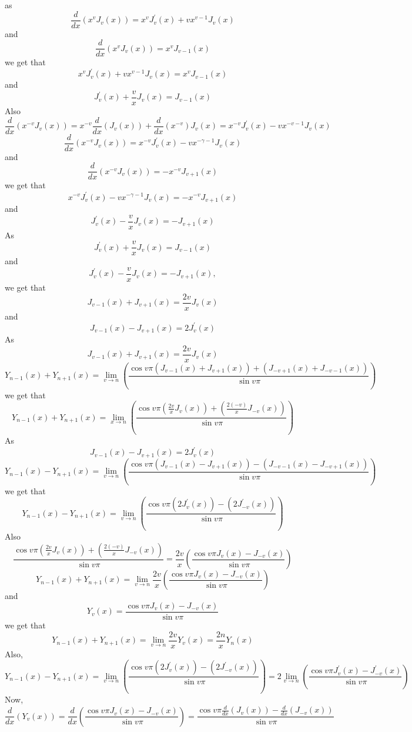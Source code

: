 \documentclass{article}
\begin{document}
\begin{flushleft}
$$$$
as
$$
\frac{d}{d x}\left(x^{v} J_{v}(x)\right)=x^{v} J_{v}^{\prime}(x)+v x^{v-1} J_{v}(x)
$$
and
$$
\frac{d}{d x}\left(x^{v} J_{v}(x)\right)=x^{v} J_{v-1}(x)
$$
we get that
$$
x^{v} J_{v}^{\prime}(x)+v x^{v-1} J_{v}(x)=x^{v} J_{v-1}(x)
$$
and
$$
J_{v}^{\prime}(x)+\frac{v}{x} J_{v}(x)=J_{v-1}(x)
$$
Also
$$
\frac{d}{d x}\left(x^{-v} J_{v}(x)\right)=x^{-v} \frac{d}{d x}\left(J_{v}(x)\right)+\frac{d}{d x}\left(x^{-v}\right) J_{v}(x)=x^{-v} J_{v}^{\prime}(x)-v x^{-v-1} J_{v}(x)
$$
$$
\frac{d}{d x}\left(x^{-v} J_{v}(x)\right)=x^{-v} J_{v}^{\prime}(x)-v x^{-\gamma-1} J_{v}(x)
$$
and
$$
\frac{d}{d x}\left(x^{-v} J_{v}(x)\right)=-x^{-v} J_{v+1}(x)
$$
we get that
$$
x^{-v} J_{v}^{\prime}(x)-v x^{-\gamma-1} J_{v}(x)=-x^{-v} J_{v+1}(x)
$$
and
$$
J_{v}^{\prime}(x)-\frac{v}{x} J_{v}(x)=-J_{v+1}(x)
$$
As $$J_{v}^{\prime}(x)+\frac{v}{x} J_{v}(x)=J_{v-1}(x)$$ 
and 
$$J_{v}^{\prime}(x)-\frac{v}{x} J_{v}(x)=-J_{v+1}(x),$$
we get that
$$J_{v-1}(x)+J_{v+1}(x)=\frac{2 v}{x} J_{v}(x)$$ and 
$$J_{v-1}(x)-J_{v+1}(x)=2 J_{v}^{\prime}(x)$$
As
$$J_{v-1}(x)+J_{v+1}(x)=\frac{2 v}{x} J_{v}(x)$$
$$
Y_{n-1}(x)+Y_{n+1}(x)=\lim _{v \rightarrow n}\left(\frac{\cos v \pi\left(J_{v-1}(x)+J_{v+1}(x)\right)+\left(J_{-v+1}(x)+J_{-v-1}(x)\right)}{\sin v \pi}\right)
$$
we get that
$$
Y_{n-1}(x)+Y_{n+1}(x)=\lim _{x \rightarrow n}\left(\frac{\cos v \pi\left(\frac{2 v}{x} J_{v}(x)\right)+\left(\frac{2(-v)}{x} J_{-v}(x)\right)}{\sin v \pi}\right)
$$
As
$$
J_{v-1}(x)-J_{v+1}(x)=2 J_{v}^{\prime}(x)
$$
$$
Y_{n-1}(x)-Y_{n+1}(x)=\lim _{v \rightarrow n}\left(\frac{\cos v \pi\left(J_{v-1}(x)-J_{v+1}(x)\right)-\left(J_{-v-1}(x)-J_{-v+1}(x)\right)}{\sin v \pi}\right)
$$
we get that
$$
Y_{n-1}(x)-Y_{n+1}(x)=\lim _{v \rightarrow n}\left(\frac{\cos v \pi\left(2 J_{v}^{\prime}(x)\right)-\left(2 J_{-v}^{\prime}(x)\right)}{\sin v \pi}\right)
$$
Also
$$
\frac{\cos v \pi\left(\frac{2 v}{x} J_{v}(x)\right)+\left(\frac{2(-v)}{x} J_{-v}(x)\right)}{\sin v \pi}=\frac{2 v}{x}\left(\frac{\cos v \pi J_{v}(x)-J_{-v}(x)}{\sin v \pi}\right)
$$
$$
Y_{n-1}(x)+Y_{n+1}(x)=\lim _{v \rightarrow n} \frac{2 v}{x}\left(\frac{\cos v \pi J_{v}(x)-J_{-v}(x)}{\sin v \pi}\right)
$$
and
$$
Y_{v}(x)=\frac{\cos v \pi J_{v}(x)-J_{-v}(x)}{\sin v \pi}
$$
we get that
$$
Y_{n-1}(x)+Y_{n+1}(x)=\lim _{v \rightarrow n} \frac{2 v}{x} Y_{v}(x)=\frac{2 n}{x} Y_{n}(x)
$$
Also,
$$
Y_{n-1}(x)-Y_{n+1}(x)=\lim _{v \rightarrow n}\left(\frac{\cos v \pi\left(2 J_{v}^{\prime}(x)\right)-\left(2 J_{-v}^{\prime}(x)\right)}{\sin v \pi}\right)=2 \lim _{v \rightarrow n}\left(\frac{\cos v \pi J_{v}^{\prime}(x)-J_{-v}^{\prime}(x)}{\sin v \pi}\right)
$$
Now,
$$
\frac{d}{d x}\left(Y_{v}(x)\right)=\frac{d}{d x}\left(\frac{\cos v \pi J_{v}(x)-J_{-v}(x)}{\sin v \pi}\right)=\frac{\cos v \pi \frac{d}{d x}\left(J_{v}(x)\right)-\frac{d}{d x}\left(J_{-v}(x)\right)}{\sin v \pi}
$$
\end{flushleft}
\end{document}

